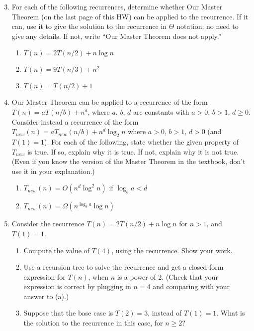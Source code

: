 \documentclass{article}
\begin{document}
\begin{enumerate}
    \setcounter{enumi}{2}
    \item For each of the following recurrences, determine whether Our Master Theorem (on the last page of this HW) can be applied to the recurrence. If it can, use it to give the solution to the recurrence in $\Theta$ notation; no need to give any details. If not, write “Our Master Theorem does not apply.”
    \begin{enumerate}
        \item $T(n) = 2T(n/2) + n \log n$
        \item $T(n) = 9T(n/3) + n^2$
        \item $T(n) = T(n/2) + 1$
    \end{enumerate}
\end{enumerate}

\begin{enumerate}
    \setcounter{enumi}{3}
    \item Our Master Theorem can be applied to a recurrence of the form $T(n) = aT(n/b) + n^d$, where $a$, $b$, $d$ are constants with $a > 0$, $b > 1$, $d \ge 0$. Consider instead a recurrence of the form $T_{new}(n) = aT_{new}(n/b) + n^d \log_2 n$ where $a > 0$, $b > 1$, $d > 0$ (and $T(1) = 1$).
    For each of the following, state whether the given property of $T_{new}$ is true. If so, explain why it is true. If not, explain why it is not true. (Even if you know the version of the Master Theorem in the textbook, don’t use it in your explanation.)
    \begin{enumerate}
        \item $T_{new}(n) = O(n^d \log^2 n)$ if $\log_b a < d$
        \item $T_{new}(n) = \Omega(n^{\log_b a} \log n)$
    \end{enumerate}
\end{enumerate}

\begin{enumerate}
    \setcounter{enumi}{4}
    \item Consider the recurrence $T(n) = 2T(n/2) + n \log n$ for $n > 1$, and $T(1) = 1$.
    \begin{enumerate}
        \item Compute the value of $T(4)$, using the recurrence. Show your work.
        \item Use a recursion tree to solve the recurrence and get a closed-form expression for $T(n)$, when $n$ is a power of 2. (Check that your expression is correct by plugging in $n = 4$ and comparing with your answer to (a).)
        \item Suppose that the base case is $T(2) = 3$, instead of $T(1) = 1$. What is the solution to the recurrence in this case, for $n \ge 2$?
    \end{enumerate}
\end{enumerate}
\end{document}
